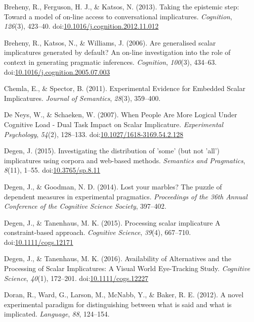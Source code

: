 \documentclass[floatsintext,man]{apa6}
\theoremstyle{definition}
\theoremstyle{definition}
\theoremstyle{definition}
\theoremstyle{remark}
\begin{document}
\hypertarget{ref-Breheny2013}{}
Breheny, R., Ferguson, H. J., \& Katsos, N. (2013). Taking the epistemic
step: Toward a model of on-line access to conversational implicatures.
\emph{Cognition}, \emph{126}(3), 423--40.
doi:\href{https://doi.org/10.1016/j.cognition.2012.11.012}{10.1016/j.cognition.2012.11.012}

\hypertarget{ref-Breheny2006}{}
Breheny, R., Katsos, N., \& Williams, J. (2006). Are generalised scalar
implicatures generated by default? An on-line investigation into the
role of context in generating pragmatic inferences. \emph{Cognition},
\emph{100}(3), 434--63.
doi:\href{https://doi.org/10.1016/j.cognition.2005.07.003}{10.1016/j.cognition.2005.07.003}

\hypertarget{ref-Chemla2011}{}
Chemla, E., \& Spector, B. (2011). Experimental Evidence for Embedded
Scalar Implicatures. \emph{Journal of Semantics}, \emph{28}(3),
359--400.

\hypertarget{ref-DeNeys2007}{}
De Neys, W., \& Schaeken, W. (2007). When People Are More Logical Under
Cognitive Load - Dual Task Impact on Scalar Implicature.
\emph{Experimental Psychology}, \emph{54}(2), 128--133.
doi:\href{https://doi.org/10.1027/1618-3169.54.2.128}{10.1027/1618-3169.54.2.128}

\hypertarget{ref-Degen2015}{}
Degen, J. (2015). Investigating the distribution of 'some' (but not
'all') implicatures using corpora and web-based methods. \emph{Semantics
and Pragmatics}, \emph{8}(11), 1--55.
doi:\href{https://doi.org/10.3765/sp.8.11}{10.3765/sp.8.11}

\hypertarget{ref-Degen2014}{}
Degen, J., \& Goodman, N. D. (2014). Lost your marbles? The puzzle of
dependent measures in experimental pragmatics. \emph{Proceedings of the
36th Annual Conference of the Cognitive Science Society}, 397--402.

\hypertarget{ref-DegenTanenhaus2015}{}
Degen, J., \& Tanenhaus, M. K. (2015). Processing scalar implicature A
constraint-based approach. \emph{Cognitive Science}, \emph{39}(4),
667--710.
doi:\href{https://doi.org/10.1111/cogs.12171}{10.1111/cogs.12171}

\hypertarget{ref-DegenTanenhaus2016}{}
Degen, J., \& Tanenhaus, M. K. (2016). Availability of Alternatives and
the Processing of Scalar Implicatures: A Visual World Eye-Tracking
Study. \emph{Cognitive Science}, \emph{40}(1), 172--201.
doi:\href{https://doi.org/10.1111/cogs.12227}{10.1111/cogs.12227}

\hypertarget{ref-Doran2012}{}
Doran, R., Ward, G., Larson, M., McNabb, Y., \& Baker, R. E. (2012). A
novel experimental paradigm for distinguishing between what is said and
what is implicated. \emph{Language}, \emph{88}, 124--154.
\end{document}
